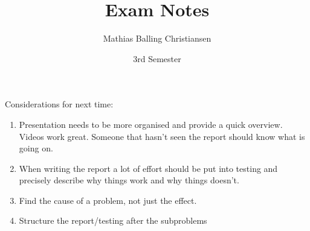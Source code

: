 \documentclass{article}
\title{Exam Notes}
\author{Mathias Balling Christiansen}
\date{3rd Semester}
\begin{document}
\maketitle

Considerations for next time:

\begin{enumerate}
\item Presentation needs to be more organised and provide a quick overview. Videos work great. 
Someone that hasn't seen the report should know what is going on. 
\item When writing the report a lot of effort should be put into testing and precisely describe why things work and why things doesn't.
\item Find the cause of a problem, not just the effect.
\item Structure the report/testing after the subproblems
\end{enumerate}
\end{document}
